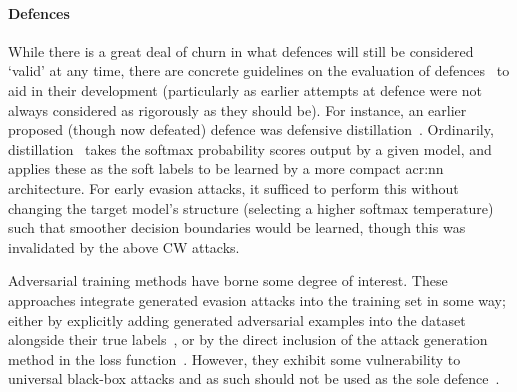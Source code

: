 %

\paragraph{Defences}
While there is a great deal of churn in what defences will still be considered `valid' at any time, there are concrete guidelines on the evaluation of defences~\parencite{DBLP:journals/corr/abs-1902-06705} to aid in their development (particularly as earlier attempts at defence were not always considered as rigorously as they should be).
For instance, an earlier proposed (though now defeated) defence was defensive distillation~\parencite{DBLP:conf/sp/PapernotM0JS16}.
Ordinarily, distillation~\parencite{DBLP:journals/corr/HintonVD15} takes the softmax probability scores output by a given model, and applies these as the soft labels to be learned by a more compact \gls{acr:nn} architecture.
For early evasion attacks, it sufficed to perform this without changing the target model's structure (selecting a higher softmax temperature) such that smoother decision boundaries would be learned, though this was invalidated by the above CW attacks.


Adversarial training methods have borne some degree of interest.
These approaches integrate generated evasion attacks into the training set in some way; either by explicitly adding generated adversarial examples into the dataset alongside their true labels~\parencite{DBLP:journals/corr/abs-1712-09196}, or by the direct inclusion of the attack generation method in the loss function~\parencite{DBLP:conf/iclr/MadryMSTV18}.
However, they exhibit some vulnerability to universal black-box attacks and as such should not be used as the sole defence~\parencite{DBLP:conf/iclr/TramerKPGBM18}.

